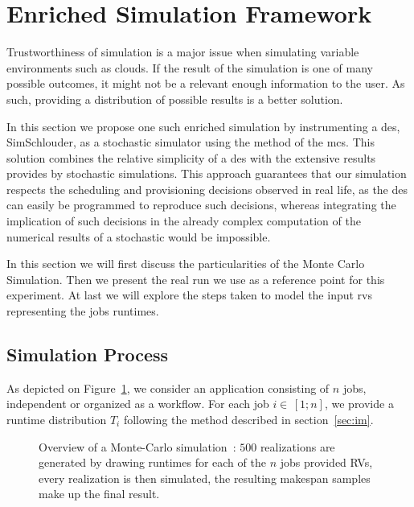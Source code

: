 \documentclass[10pt,conference,compsocconf]{IEEEtran}
\begin{document}
\section{Enriched Simulation Framework}
\label{sec:enriched-sim}

Trustworthiness of simulation is a major issue when simulating variable
environments such as clouds. If the result of the simulation is one of many
possible outcomes, it might not be a relevant enough information to the user. 
As such, providing a distribution of possible results is a better solution.

In this section we propose one such enriched simulation by instrumenting a
\ac{des}, SimSchlouder, as a stochastic simulator using the method of the
\acf{mcs}. This solution combines the relative simplicity of a \ac{des} with the
extensive results provides by stochastic simulations. This approach guarantees
that our simulation respects the scheduling and provisioning decisions observed
in real life, as the \ac{des} can easily be programmed to reproduce such
decisions, whereas integrating the implication of such decisions in the already
complex computation of the numerical results of a stochastic would be
impossible.

In this section we will first discuss the particularities of the Monte Carlo
Simulation. Then we present the real run we use as a reference point for this
experiment. At last we will explore the steps taken to model the
input \acp{rv} representing the jobs runtimes.

\subsection{Simulation Process}
As  depicted   on  Figure~\ref{fig:mc-process},  we  consider   an  application
consisting of  $n$ jobs, independent  or organized as  a workflow. For  each job
$i  \in\,[1;n]$, we provide  a runtime distribution $T_i$ following the method
described in section~\ref{sec:im}.

\begin{figure}
	\centering
	\resizebox{0.5\textwidth}{!}{%
		
		}
\caption{Overview of a Monte-Carlo simulation~: $500$ realizations are generated
by drawing runtimes for each of the $n$ jobs provided RVs, every realization is
then simulated, the resulting makespan samples make up the final result.}\label{fig:mc-process}
\end{figure}
\end{document}
